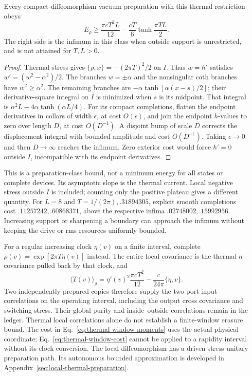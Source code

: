 \begin{proposition}
\label{prop:thermal-window-cost}
Every compact-diffeomorphism vacuum preparation with this thermal
restriction obeys
\begin{equation}\label{eq:thermal-window-cost}
 E_\rho\ge\frac{\pi cT^2L}{12}
       -\frac{cT}{6}\tanh\frac{\pi TL}{2}.
\end{equation}
The right side is the infimum in this class when outside support is
unrestricted, and is not attained for $T,L>0$.
\end{proposition}
\begin{proof}
Thermal stress gives $\{\rho,x\}=-(2\pi T)^2/2$ on $I$.
Thus $w=h'$ satisfies $w'=(w^2-\alpha^2)/2$.
The branches $w=\pm\alpha$ and the nonsingular coth branches have
$w^2\ge\alpha^2$. The remaining branches are
$-\alpha\tanh[\alpha(x-s)/2]$; their derivative-square integral on
$I$ is minimized when $s$ is its midpoint. That integral is
$\alpha^2L-4\alpha\tanh(\alpha L/4)$.
For its compact completions, flatten the endpoint derivatives in
collars of width $\epsilon$, at cost $O(\epsilon)$, and join the
endpoint $h$-values to zero over length $D$, at cost $O(D^{-1})$.
A disjoint bump of scale $D$ corrects the displacement integral with
bounded amplitude and cost $O(D^{-1})$. Taking $\epsilon\to0$ and
then $D\to\infty$ reaches the infimum. Zero exterior cost would
force $h'=0$ outside $I$, incompatible with its endpoint derivatives.
\end{proof}

This is a preparation-class bound, not a minimum energy for all
states or complete devices. Its asymptotic slope is the thermal
current. Local negative stress outside $I$ is included; counting only
the positive plateau gives a different quantity. For $L=8$ and
$T=1/(2\pi),.31894305$, explicit smooth completions cost
$.11257242,.60868371$, above the respective infima
$.02748002,.15992956$. Increasing support or sharpening a boundary
can approach the infimum without keeping the drive or rms resources
uniformly bounded.

For a regular increasing clock $\eta(v)$ on a finite interval, complete
$\rho(v)=\exp[2\pi T\eta(v)]$ instead. The entire local covariance
is the thermal $\eta$ covariance pulled back by that clock, and
\begin{equation}\label{eq:prepared-clock-stress}
 \langle T(v)\rangle_\rho
 =\eta'(v)^2\frac{\pi cT^2}{12}
       -\frac{c}{24\pi}\{\eta,v\}.
\end{equation}
Two independently prepared copies therefore supply the two-port
input correlations on the operating interval, including the output
cross covariance and switching stress. Their global purity and
inside--outside correlations remain in the ledger. Thermal local
correlations alone do not establish a finite-window erasure bound.
The cost in Eq.~\eqref{eq:thermal-window-moments} uses the actual
physical coordinate; Eq.~\eqref{eq:thermal-window-cost} cannot be
applied to a rapidity interval without its clock conversion.
The local diffeomorphism has a driven stress-unitary preparation
path. Its autonomous bounded approximation is developed in
Appendix~\ref{sec:local-thermal-preparation}.

